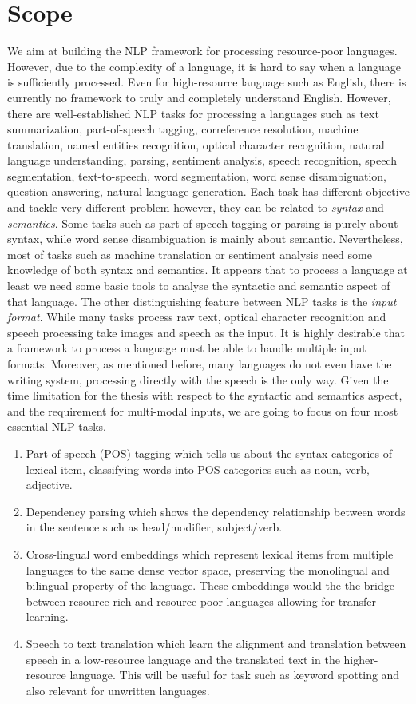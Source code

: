 \documentclass[12pt,twoside,final,hidelinks]{ltthesis}
\theoremstyle{definition}
\begin{document}
\section{Scope}
We aim at building the NLP framework for processing resource-poor languages. However, due to the complexity of a language, it is hard to say when a language is sufficiently processed. Even for high-resource language such as English, there is currently no framework to truly and completely understand English. However, there are well-established NLP tasks for processing a languages such as text summarization, part-of-speech tagging, correference resolution, machine translation, named entities recognition, optical character recognition, natural language understanding, parsing, sentiment analysis, speech recognition, speech segmentation, text-to-speech, word segmentation, word sense disambiguation, question answering, natural language generation. 
Each task has different objective and tackle very different problem however, they can be related to \textit{syntax} and \textit{semantics}. Some tasks such as part-of-speech tagging or parsing is purely about syntax, while word sense disambiguation is mainly about semantic. Nevertheless, most of tasks such as machine translation or sentiment analysis need some knowledge of both syntax and semantics. It appears that to process a language at least we need some basic tools to analyse the syntactic and semantic aspect of that language. 
The other distinguishing feature between NLP tasks is the \textit{input format}. While many tasks process raw text, optical character recognition and speech processing take images and speech as the input. It is highly desirable that a framework to process a language must be able to handle multiple input formats. Moreover, as mentioned before, many languages do not even have the writing system, processing directly with the speech is the only way. 
Given the time limitation for the thesis with respect to the syntactic and semantics aspect, and the requirement for multi-modal inputs, we are going to focus on four most essential NLP tasks. 
\begin{enumerate}
\item Part-of-speech (POS) tagging which tells us about the syntax categories of lexical item, classifying words into POS categories such as noun, verb, adjective.
\item Dependency parsing which shows the dependency relationship between words in the sentence such as head/modifier, subject/verb. 
\item Cross-lingual word embeddings which represent lexical items from multiple languages to the same dense vector space, preserving the monolingual and bilingual property of the language. These embeddings would the the bridge between resource rich and resource-poor languages allowing for transfer learning. 
\item Speech to text translation which learn the alignment and translation between speech in a low-resource language and the translated text in the higher-resource language. This will be useful for task such as keyword spotting and also relevant for unwritten languages.  
\end{enumerate}
\end{document}
